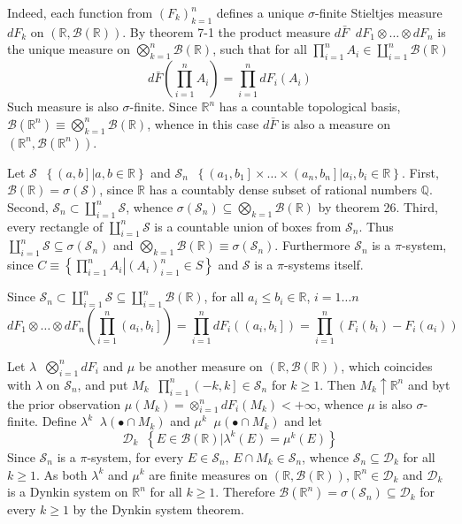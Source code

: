 \documentclass[a4paper]{article}
\newcommand{\obj}[1]{\left\{ #1 \right \}}
\newcommand{\ploc}[1]{\left ( #1 \right ]}
\newcommand{\brac}[1]{\left ( #1 \right )}
\newcommand{\induc}[1]{\left . #1 \right \vert}
\newcommand{\Real}{\mathbb{R}}
\newcommand{\Dcal}{\mathcal{D}}
\newcommand{\Scal}{\mathcal{S}}
\newcommand{\borel}[1]{\mathcal{B}\brac{#1}}
\newcommand{\defn}{\mathop{\overset{\Delta}{=}}\nolimits}
\begin{document}
Indeed, each function from $\brac{F_k}_{k=1}^n$ defines a unique $\sigma$-finite Stieltjes measure $dF_k$ on $\brac{\Real, \borel{\Real}}$. By theorem 7-1 the product measure $d\bar{F}\defn dF_1\otimes\ldots\otimes dF_n$ is the unique measure on $\bigotimes_{k=1}^n \borel{\Real}$, such that for all $\prod_{i=1}^n A_i \in \coprod_{i=1}^n \borel{\Real}$ \[d\bar{F}\brac{\prod_{i=1}^n A_i} = \prod_{i=1}^n dF_i\brac{A_i}\] Such measure is also $\sigma$-finite. Since $\Real^n$ has a countable topological basis, $\borel{\Real^n} \equiv \bigotimes_{k=1}^n \borel{\Real}$, whence in this case $d\bar{F}$ is also a measure on $\brac{\Real^n, \borel{\Real^n}}$.

Let $\Scal\defn \obj{\induc{ \ploc{a, b} } a, b\in \Real}$ and $\Scal_n\defn \obj{ \induc{ \ploc{a_1, b_1}\times\ldots\times \ploc{a_n, b_n} } a_i, b_i\in \Real }$. First, $\borel{\Real} = \sigma\brac{\Scal}$, since $\Real$ has a countably dense subset of rational numbers $\mathbb{Q}$. Second, $\Scal_n \subset \coprod_{i=1}^n \Scal$, whence $\sigma\brac{\Scal_n}\subseteq \bigotimes_{k=1}\borel{\Real}$ by theorem 26. Third, every rectangle of $\coprod_{i=1}^n \Scal$ is a countable union of boxes from $\Scal_n$. Thus $\coprod_{i=1}^n \Scal \subseteq \sigma\brac{\Scal_n}$ and $\bigotimes_{k=1}\borel{\Real} \equiv \sigma\brac{\Scal_n}$. Furthermore $\Scal_n$ is a $\pi$-system, since $C\equiv \obj{\induc{ \prod_{i=1}^n A_i } \brac{A_i}_{i=1}^n \in S }$ and $\Scal$ is a $\pi$-systems itself.

Since $\Scal_n \subset \coprod_{i=1}^n \Scal \subseteq \coprod_{i=1}^n \borel{\Real}$, for all $a_i\leq b_i\in \Real$, $i=1\ldots n$ \[dF_1\otimes\ldots\otimes dF_n\brac{ \prod_{i=1}^n \ploc{a_i, b_i} } = \prod_{i=1}^n dF_i\brac{ \ploc{a_i, b_i} } = \prod_{i=1}^n \brac{F_i\brac{b_i} - F_i\brac{a_i}}\] 

Let $\lambda \defn \bigotimes_{i=1}^n dF_i$ and $\mu$ be another measure on $\brac{\Real, \borel{\Real}}$, which coincides with $\lambda$ on $\Scal_n$, and put $M_k \defn \prod_{i=1}^n\ploc{-k, k}\in \Scal_n$ for $k\geq 1$. Then $M_k\uparrow \Real^n$ and byt the prior observation $\mu\brac{M_k} = \otimes_{i=1}^n dF_i \brac{ M_k } < +\infty$, whence $\mu$ is also $\sigma$-finite. Define $\lambda^k\defn \lambda\brac{\bullet \cap M_k}$ and $\mu^k\defn \mu\brac{\bullet \cap M_k}$ and let \[\Dcal_k\defn \obj{ \induc{ E\in \borel{\Real} } \lambda^k\brac{E} = \mu^k\brac{E} } \] Since $\Scal_n$ is a $\pi$-system, for every $E\in \Scal_n$, $E\cap M_k\in \Scal_n$, whence $\Scal_n\subseteq \Dcal_k$ for all $k\geq 1$. As both $\lambda^k$ and $\mu^k$ are finite measures on $\brac{\Real, \borel{\Real}}$, $\Real^n\in \Dcal_k$ and $\Dcal_k$ is a Dynkin system on $\Real^n$ for all $k\geq 1$. Therefore $\borel{\Real^n} = \sigma\brac{\Scal_n} \subseteq \Dcal_k$ for every $k\geq 1$ by the Dynkin system theorem.
\end{document}

